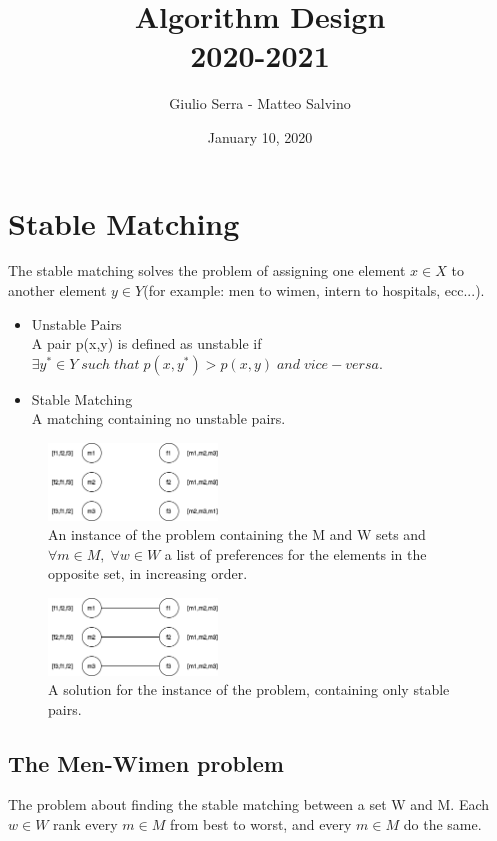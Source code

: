 \documentclass[11pt]{article}
\title{%
  Algorithm Design \\
  \large 2020-2021}
\author{Giulio Serra - Matteo Salvino}
\date{January 10, 2020}
\begin{document}
\tableofcontents

\section{Stable Matching}
The stable matching solves the problem of assigning one element $x \in X$ to another element $y \in Y$(for example: men to wimen, intern to hospitals, ecc...).

\begin{itemize}
\item Unstable Pairs\\
A pair p(x,y) is defined as unstable if $\exists y^{*} \in Y \; such \;that \;p(x,y^{*}) > p(x,y) \; and \; vice-versa. $ 

\item Stable Matching\\
A matching containing no unstable pairs.
\end{itemize}


\begin{figure}[h]
		\centering
		\includegraphics[width=0.4\textwidth ]{GS}
		\caption{An instance of the problem containing the M and W sets and $\forall m \in M, \; \forall w \in W$ a list of preferences for the elements in the opposite set, in increasing order.}
\end{figure}

\begin{figure}[h]
		\centering
		\includegraphics[width=0.4\textwidth ]{GS-Solved}
		\caption{A solution for the instance of the problem, containing only stable pairs.}
\end{figure}


\subsection{The Men-Wimen problem}
The problem about finding the stable matching between a set W and M. Each $w \in W$ rank every $m \in M$ from best to worst, and every $m \in M$ do the same.
\end{document}
